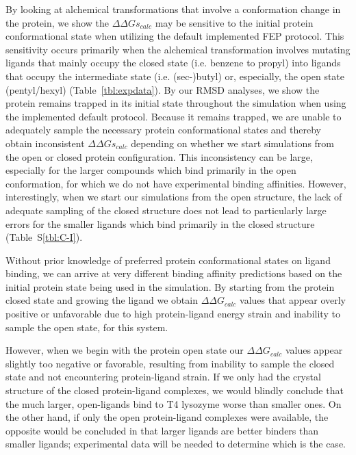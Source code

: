 By looking at alchemical transformations that involve a conformation change in the protein, we show the $\Delta\Delta Gs_{calc}$ may be sensitive to the initial protein conformational state when utilizing the default implemented FEP protocol.
This sensitivity occurs primarily when the alchemical transformation involves mutating ligands that mainly occupy the closed state (i.e. benzene to propyl) into ligands that occupy the intermediate state (i.e. (sec-)butyl) or, especially, the open state (pentyl/hexyl) (Table~\ref{tbl:expdata}).
By our RMSD analyses, we show the protein remains trapped in its initial state throughout the simulation when using the implemented default protocol.
Because it remains trapped, we are unable to adequately sample the necessary protein conformational states and thereby obtain inconsistent $\Delta\Delta Gs_{calc}$ depending on whether we start simulations from the open or closed protein configuration.
This inconsistency can be large, especially for the larger compounds which bind primarily in the open conformation, for which we do not have experimental binding affinities.
However, interestingly, when we start our simulations from the open structure, the lack of adequate sampling of the closed structure does not lead to particularly large errors for the smaller ligands which bind primarily in the closed structure (Table~S\ref{tbl:C-I}).

Without prior knowledge of preferred protein conformational states on ligand binding, we can arrive at very different binding affinity predictions based on the initial protein state being used in the simulation.
By starting from the protein closed state and growing the ligand we obtain $\Delta\Delta G_{calc}$ values that appear overly positive or unfavorable due to high protein-ligand energy strain and inability to sample the open state, for this system.

However, when we begin with the protein open state our $\Delta\Delta G_{calc}$ values appear slightly too negative or favorable, resulting from inability to sample the closed state and not encountering protein-ligand strain.
If we only had the crystal structure of the closed protein-ligand complexes, we would blindly conclude that the much larger, open-ligands bind to T4 lysozyme worse than smaller ones.
On the other hand, if only the open protein-ligand complexes were available, the opposite would be concluded in that larger ligands are better binders than smaller ligands; experimental data will be needed to determine which is the case.


